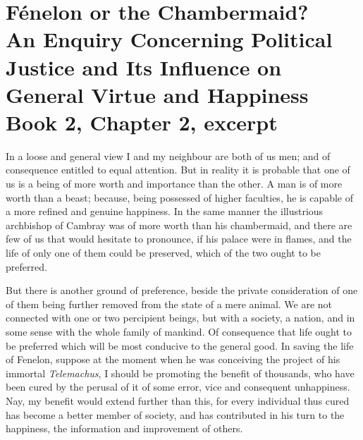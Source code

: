 
\author{William Godwin}
\chapter[William Godwin -- F\'enelon or the Chambermaid?]{F\'enelon or
the Chambermaid?\\\smaller An Enquiry Concerning Political Justice and
Its Influence on General Virtue and Happiness\\\smaller Book 2,
Chapter 2, excerpt}


In a loose and general view I and my neighbour are both of us
men; and of consequence entitled to equal attention. But in reality it
is probable that one of us is a being of more worth and importance
than the other. A man is of more worth than a beast; because, being
possessed of higher faculties, he is capable of a more refined and
genuine happiness. In the same manner  the illustrious
archbishop of Cambray was of more worth than his chambermaid, and
there are few of us that would hesitate to pronounce, if his palace
were in flames, and the life of only one of them could be preserved,
which of the two ought to be preferred.

But there is another ground of preference, beside the private
consideration of one of them being further removed from the state of a
mere animal. We are not connected with one or two percipient beings,
but with a society, a nation, and in some sense with the whole family
of mankind. Of consequence that life ought to be preferred which will
be most conducive to the general good. In saving the life of Fenelon,
suppose at the moment when he was conceiving the project of his
immortal \textit{Telemachus}, I should be promoting the benefit of
thousands, who have been cured by the perusal of it of some error,
vice and consequent unhappiness. Nay, my benefit would extend further
than this, for every individual thus cured has become a better member
of society, and has contributed in his turn to the happiness, the
information and improvement of others.

